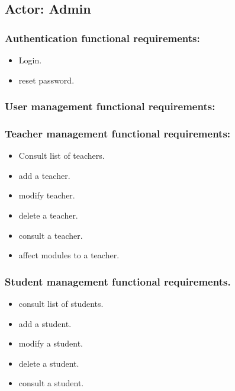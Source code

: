 \documentclass[a4paper,12p]{article}
\begin{document}
     \subsection{Actor: Admin}
     \begin{itemize}
     \subsubsection{Authentication functional requirements:}
     \begin{itemize}
         \item Login.
         \item reset password.
     \end{itemize}

     \subsubsection{User management functional requirements:}
     \begin{itemize}

        \subsubsection{Teacher management functional requirements:}
         \begin{itemize}
             \item Consult list of teachers.
             \item add a teacher.
             \item modify teacher.
             \item delete a teacher.
             \item consult a teacher.
             \item affect modules to a teacher.
         \end{itemize}

         \subsubsection{Student management functional requirements.}
         \begin{itemize}
             \item consult list of students.
             \item add a student.
             \item modify a student.
             \item delete a student.
             \item consult a student.
         \end{itemize}


\end{itemize}
\end{itemize}
\end{document}

